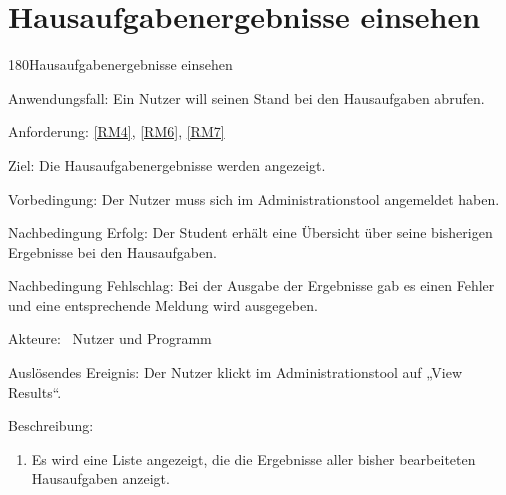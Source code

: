 \section{Hausaufgabenergebnisse einsehen}
\begin{function}{180}{Hausaufgabenergebnisse einsehen}
\item[Anwendungsfall:] Ein Nutzer will seinen Stand bei den Hausaufgaben abrufen.
\item[Anforderung:] \ref{RM4}, \ref{RM6}, \ref{RM7}
\item[Ziel:]  Die Hausaufgabenergebnisse werden angezeigt.
\item[Vorbedingung:] Der Nutzer muss sich im Administrationstool angemeldet haben.
\item[Nachbedingung Erfolg:]  Der Student erhält eine Übersicht über seine bisherigen Ergebnisse bei den Hausaufgaben.
\item[Nachbedingung Fehlschlag:] Bei der Ausgabe der Ergebnisse gab es einen Fehler und eine entsprechende Meldung wird ausgegeben.
\item[Akteure:] ~Nutzer und Programm
\item[Auslösendes Ereignis:] Der Nutzer klickt im Administrationstool auf „View Results“.
\item[Beschreibung:] ~
\begin{enumerate}
  \item  Es wird eine Liste angezeigt, die die Ergebnisse aller bisher bearbeiteten Hausaufgaben anzeigt.
\end{enumerate}
\end{function}

